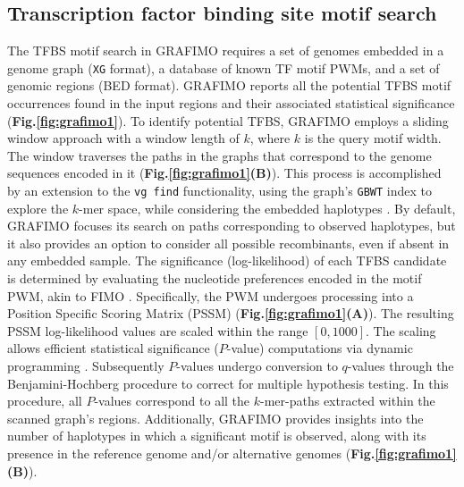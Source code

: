 \documentclass[a4paper, titlepage, openright]{book}
\newcommand{\grafimo}{GRAFIMO\xspace}
\begin{document}
\subsection{Transcription factor binding site motif search}
The TFBS motif search in \grafimo requires a set of genomes embedded in a genome graph (\texttt{XG} format), a database of known TF motif PWMs, and a set of genomic regions (BED format). \grafimo reports all the potential TFBS motif occurrences found in the input regions and their associated statistical significance (\textbf{Fig.\ref{fig:grafimo1}}). To identify potential TFBS, \grafimo employs a sliding window approach with a window length of $k$, where $k$ is the query motif width. The window traverses the paths in the graphs that correspond to the genome sequences encoded in it (\textbf{Fig.\ref{fig:grafimo1}(B)}). This process is accomplished by an extension to the \texttt{vg find} functionality, using the graph's \texttt{GBWT} index to explore the $k$-mer space, while considering the embedded haplotypes \citep{siren2020haplotype}. By default, \grafimo focuses its search on paths corresponding to observed haplotypes, but it also provides an option to consider all possible recombinants, even if absent in any embedded sample. The significance (log-likelihood) of each TFBS candidate is determined by evaluating the nucleotide preferences encoded in the motif PWM, akin to FIMO \citep{grant2011fimo}. Specifically, the PWM undergoes processing into a Position Specific Scoring Matrix (PSSM) (\textbf{Fig.\ref{fig:grafimo1}(A)}). The resulting PSSM log-likelihood values are scaled within the range $[0, 1000]$. The scaling allows efficient statistical significance ($P$-value) computations via dynamic programming \citep{grant2011fimo}. Subsequently $P$-values undergo conversion to $q$-values through the Benjamini-Hochberg procedure to correct for multiple hypothesis testing. In this procedure, all $P$-values correspond to all the $k$-mer-paths extracted within the scanned graph's regions. Additionally, \grafimo provides insights into the number of haplotypes in which a significant motif is observed, along with its presence in the reference genome and/or alternative genomes (\textbf{Fig.\ref{fig:grafimo1}(B)}). 
\end{document}
